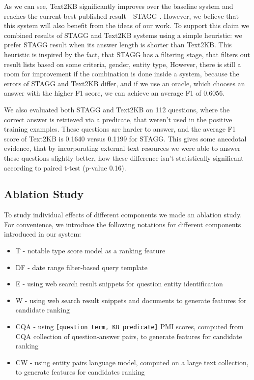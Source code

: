 As we can see, Text2KB significantly improves over the baseline system and reaches the current best published result - STAGG \cite{yih2015semantic}.
However, we believe that this system will also benefit from the ideas of our work.
To support this claim we combined results of STAGG and Text2KB systems using a simple heuristic: we prefer STAGG result when its answer length is shorter than Text2KB.
This heuristic is inspired by the fact, that STAGG has a filtering stage, that filters out result lists based on some criteria, \ie gender, entity type, \etc
However, there is still a room for improvement if the combination is done inside a system, because the errors of STAGG and Text2KB differ, and if we use an oracle, which chooses an answer with the higher F1 score, we can achieve an average F1 of 0.6056.

We also evaluated both STAGG and Text2KB on 112 questions, where the correct answer is retrieved via a predicate, that weren't used in the positive training examples.
These questions are harder to answer, and the average F1 score of Text2KB is 0.1640 versus 0.1199 for STAGG.
This gives some anecdotal evidence, that by incorporating external text resources we were able to answer these questions slightly better, how these difference isn't statistically significant according to paired t-test (p-value 0.16).

\subsection{Ablation Study}

To study individual effects of different components we made an ablation study.
For convenience, we introduce the following notations for different components introduced in our system:
\vspace{-0.1cm}
\begin{itemize}
\setlength\itemsep{-0.5em}
\item T - notable type score model as a ranking feature
\item DF - date range filter-based query template
\item E - using web search result snippets for question entity identification
\item W - using web search result snippets and documents to generate features for candidate ranking
\item CQA - using \texttt{[question term, KB predicate]} PMI scores, computed from CQA collection of question-answer pairs, to generate features for candidate ranking
\item CW - using entity pairs language model, computed on a large text collection, to generate features for candidates ranking
\end{itemize}

